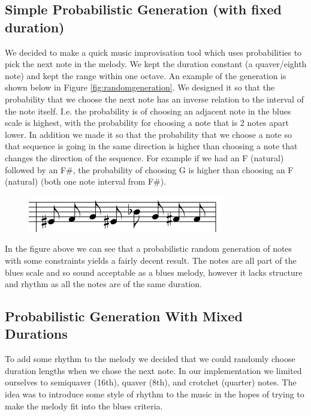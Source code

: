 \documentclass[pdftex,12pt,a4paper]{report}
\begin{document}
\subsection{Simple Probabilistic Generation (with fixed duration)}
We decided to make a quick music improvisation tool which uses probabilities to pick the next note in the melody. We kept the duration constant (a quaver/eighth note) and kept the range within one octave. An example of the generation is shown below in Figure \ref{fig:randomgeneration}. We designed it so that the probability that we choose the next note has an inverse relation to the interval of the note itself. I.e. the probability is of choosing an adjacent note in the blues scale is highest, with the probability for choosing a note that is 2 notes apart lower. In addition we made it so that the probability that we choose a note so that sequence is going in the same direction is higher than choosing a note that changes the direction of the sequence. For example if we had an F (natural) followed by an F\#, the probability of choosing G is higher than choosing an F (natural) (both one note interval from F\#).

\begin{figure}[here]
  \centering
  \includegraphics[scale=0.7]{figure/randomgeneration.png}
  \label{fig:probabilisticgeneration}
\end{figure}

In the figure above we can see that a probabilistic random generation of notes with some constraints yields a fairly decent result. The notes are all part of the blues scale and so sound acceptable as a blues melody, however it lacks structure and rhythm as all the notes are of the same duration. 

\subsection{Probabilistic Generation With Mixed Durations}
To add some rhythm to the melody we decided that we could randomly choose duration lengths when we chose the next note. In our implementation we limited ourselves to semiquaver (16th), quaver (8th), and crotchet (quarter) notes. The idea was to introduce some style of rhythm to the music in the hopes of trying to make the melody fit into the blues criteria.
\end{document}
